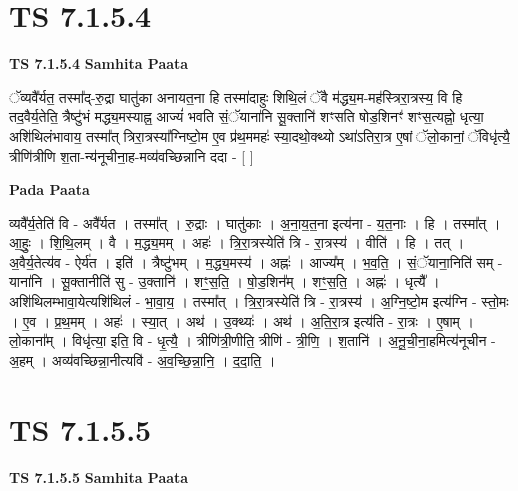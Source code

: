 \documentclass[17pt]{extarticle}
\begin{document}

\section{ TS 7.1.5.4 }

\textbf{TS 7.1.5.4 } \newline
\textbf{Samhita Paata} \newline

ॅव्यवै᳚र्यत॒ तस्मा᳚द्-रु॒द्रा घातु॑का अनायत॒ना हि तस्मा॑दाहुः शिथि॒लं ॅवै म॑द्ध्य॒म-मह॑स्त्रिरा॒त्रस्य॒ वि हि तद॒वैर्य॒तेति॒ त्रैष्टु॑भं मद्ध्य॒मस्याह्न॒ आज्यं॑ भवति सं॒ॅयाना॑नि सू॒क्तानि॑ शꣳसति षोड॒शिनꣳ॑ शꣳस॒त्यह्नो॒ धृत्या॒ अशि॑थिलंभावाय॒ तस्मा᳚त् त्रिरा॒त्रस्या᳚ग्निष्टो॒म ए॒व प्र॑थ॒ममहः॑ स्या॒दथो॒क्थ्यो ऽथा॑ऽतिरा॒त्र ए॒षां ॅलो॒कानां॒ ॅविधृ॑त्यै॒ त्रीणि॑त्रीणि श॒ता-न्य॑नूचीना॒ह-मव्य॑वच्छिन्नानि ददा - [  ] \newline

\textbf{Pada Paata} \newline

व्यवै᳚र्य॒तेति॑ वि - अवै᳚र्यत । तस्मा᳚त् । रु॒द्राः । घातु॑काः । अ॒ना॒य॒त॒ना इत्य॑ना - य॒त॒नाः । हि । तस्मा᳚त् । आ॒हुः॒ । शि॒थि॒लम् । वै । म॒द्ध्य॒मम् । अहः॑ । त्रि॒रा॒त्रस्येति॑ त्रि - रा॒त्रस्य॑ । वीति॑ । हि । तत् । अ॒वैर्य॒तेत्य॑व - ऐर्य॑त । इति॑ । त्रैष्टु॑भम् । म॒द्ध्य॒मस्य॑ । अह्नः॑ । आज्य᳚म् । भ॒व॒ति॒ । सं॒ॅयाना॒निति॑ सम् - याना॑नि । सू॒क्तानीति॑ सु - उ॒क्तानि॑ । शꣳ॒॒स॒ति॒ । षो॒ड॒शिन᳚म् । शꣳ॒॒स॒ति॒ । अह्नः॑ । धृत्यै᳚ । अशि॑थिलम्भावा॒येत्यशि॑थिलं - भा॒वा॒य॒ । तस्मा᳚त् । त्रि॒रा॒त्रस्येति॑ त्रि - रा॒त्रस्य॑ । अ॒ग्नि॒ष्टो॒म इत्य॑ग्नि - स्तो॒मः । ए॒व । प्र॒थ॒मम् । अहः॑ । स्या॒त् । अथ॑ । उ॒क्थ्यः॑ । अथ॑ । अ॒ति॒रा॒त्र इत्य॑ति - रा॒त्रः । ए॒षाम् । लो॒काना᳚म् । विधृ॑त्या॒ इति॒ वि - धृ॒त्यै॒ । त्रीणि॑त्री॒णीति॒ त्रीणि॑ - त्री॒णि॒ । श॒तानि॑ । अ॒नू॒ची॒ना॒हमित्य॑नूचीन - अ॒हम् । अव्य॑वच्छिन्ना॒नीत्यवि॑ - अ॒व॒च्छि॒न्ना॒नि॒ । द॒दा॒ति॒ ।  \newline





\section{ TS 7.1.5.5 }

\textbf{TS 7.1.5.5 } \newline
\textbf{Samhita Paata} \newline
\end{document}
